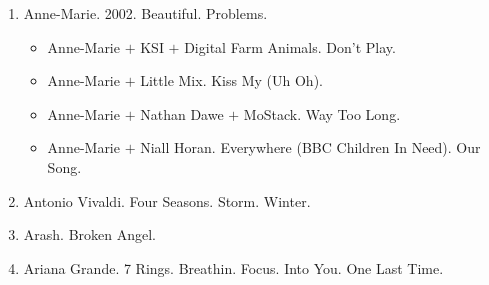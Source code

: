 \documentclass{article}
\begin{document}
\begin{enumerate}
\begin{quotation}
		It hurts deep inside
		\\

		Just let me be

		Who I am

		It's what you really need to understand

		And I hope so hard for the pain to go away
		\\

		And it's torturing me

		But I can't break free

		So I cry \& cry but just won't get it out

		The silent scream
		\\

		Can't you see how I cry for help

		'Cause you should love me just for being myself

		I'll drown in an ocean

		Of pain \& emotion

		If you don't save me right away
		\\

		Just let me be

		Who I am

		It's what you really need to understand

		And I hope so hard for the pain to go away
		\\

		And it's torturing me

		But I can't break free

		So I cry \& cry but just won't get it out

		The silent scream

		My silent scream
	\end{quotation}
	\item {\sc Anne-Marie.} 2002. Beautiful. Problems.
	\begin{itemize}
		\item {\sc Anne-Marie $+$ KSI $+$ Digital Farm Animals.} Don't Play.
		\item {\sc Anne-Marie $+$ Little Mix.} Kiss My (Uh Oh).
		\item {\sc Anne-Marie $+$ Nathan Dawe $+$ MoStack.} Way Too Long.
		\item {\sc Anne-Marie $+$ Niall Horan.} Everywhere (BBC Children In Need). Our Song.
	\end{itemize}
	\item {\sc Antonio Vivaldi.} Four Seasons. Storm. Winter.
	\item {\sc Arash.} Broken Angel.
	\item {\sc Ariana Grande.} 7 Rings. Breathin. Focus. Into You. One Last Time.


\end{enumerate}
\end{document}
